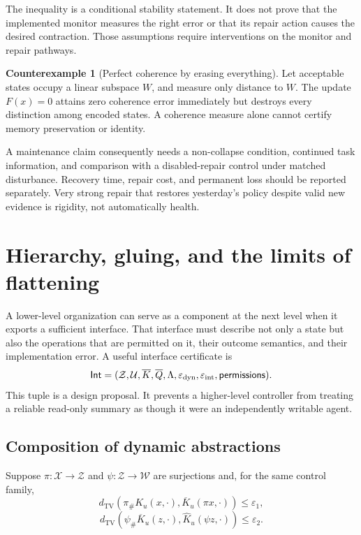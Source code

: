 \documentclass[11pt,letterpaper]{article}
\theoremstyle{plain}
\theoremstyle{definition}
\newtheorem{counterexample}[proposition]{Counterexample}
\theoremstyle{remark}
\newcommand{\TV}{d_{\mathrm{TV}}}
\newcommand{\X}{\mathcal X}
\newcommand{\Z}{\mathcal Z}
\newcommand{\U}{\mathcal U}
\newcommand{\push}{\pi_{\#}}
\begin{document}
The inequality is a conditional stability statement. It does not prove that the implemented monitor measures the right error or that its repair action causes the desired contraction. Those assumptions require interventions on the monitor and repair pathways.

\begin{counterexample}[Perfect coherence by erasing everything]\label{ex:zerocollapse}
Let acceptable states occupy a linear subspace $W$, and measure only distance to $W$. The update $F(x)=0$ attains zero coherence error immediately but destroys every distinction among encoded states. A coherence measure alone cannot certify memory preservation or identity.
\end{counterexample}

A maintenance claim consequently needs a non-collapse condition, continued task information, and comparison with a disabled-repair control under matched disturbance. Recovery time, repair cost, and permanent loss should be reported separately. Very strong repair that restores yesterday's policy despite valid new evidence is rigidity, not automatically health.

\section{Hierarchy, gluing, and the limits of flattening}\label{sec:hierarchy}
A lower-level organization can serve as a component at the next level when it exports a sufficient interface. That interface must describe not only a state but also the operations that are permitted on it, their outcome semantics, and their implementation error. A useful interface certificate is
\[
\mathsf{Int}=(\Z,\U,\overline K,\overline Q,\Lambda,
\varepsilon_{\rm dyn},\varepsilon_{\rm int},\mathsf{permissions}).
\]
This tuple is a design proposal. It prevents a higher-level controller from treating a reliable read-only summary as though it were an independently writable agent.

\subsection{Composition of dynamic abstractions}
Suppose $\pi:\X\to\Z$ and $\psi:\Z\to\mathcal W$ are surjections and, for the same control family,
\[
\TV(\push K_u(x,\cdot),\overline K_u(\pi x,\cdot))\leq\varepsilon_1,
\]
\[
\TV(\psi_{\#}\overline K_u(z,\cdot),\widehat K_u(\psi z,\cdot))\leq\varepsilon_2.
\]
\end{document}
